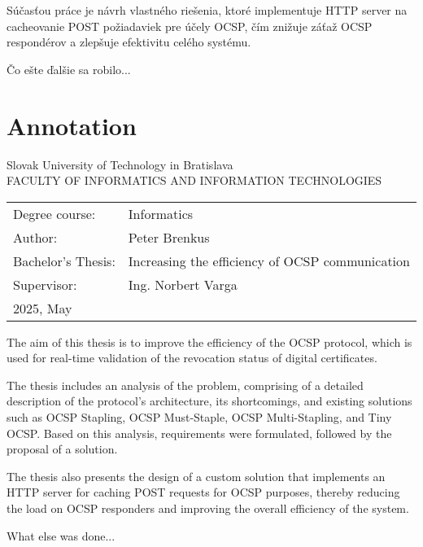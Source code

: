 \documentclass[12pt, twoside]{book}
\def\mferok{2025, May}
\def\mfenazov{Increasing the efficiency of OCSP communication}
\def\mfautor{Peter Brenkus}
\def\mfeveduci{Ing. Norbert Varga}
\begin{document}
Súčasťou práce je návrh vlastného riešenia, ktoré implementuje HTTP server na cacheovanie POST požiadaviek pre účely OCSP, čím znižuje záťaž OCSP respondérov a zlepšuje efektivitu celého systému.

Čo ešte ďalšie sa robilo...

\newpage\null\thispagestyle{empty}\newpage



\newpage
\thispagestyle{empty}
 
\section*{Annotation}
\noindent
Slovak University of Technology in Bratislava\\
FACULTY OF INFORMATICS AND INFORMATION TECHNOLOGIES\\

\begin{tabular}{@{}ll}
Degree course: & Informatics\bigskip
\bigskip  \\
Author: & \mfautor \\
Bachelor’s Thesis: & \mfenazov \\
Supervisor: & \mfeveduci \\
\mferok
\end{tabular}

\bigskip
\bigskip 
\bigskip 
\noindent

The aim of this thesis is to improve the efficiency of the OCSP protocol, which is used for real-time validation of the revocation status of digital certificates.

The thesis includes an analysis of the problem, comprising of a detailed description of the protocol’s architecture, its shortcomings, and existing solutions such as OCSP Stapling, OCSP Must-Staple, OCSP Multi-Stapling, and Tiny OCSP. Based on this analysis, requirements were formulated, followed by the proposal of a solution.

The thesis also presents the design of a custom solution that implements an HTTP server for caching POST requests for OCSP purposes, thereby reducing the load on OCSP responders and improving the overall efficiency of the system.


What else was done... 
 
\newpage\null\thispagestyle{empty}\newpage

\end{document}
